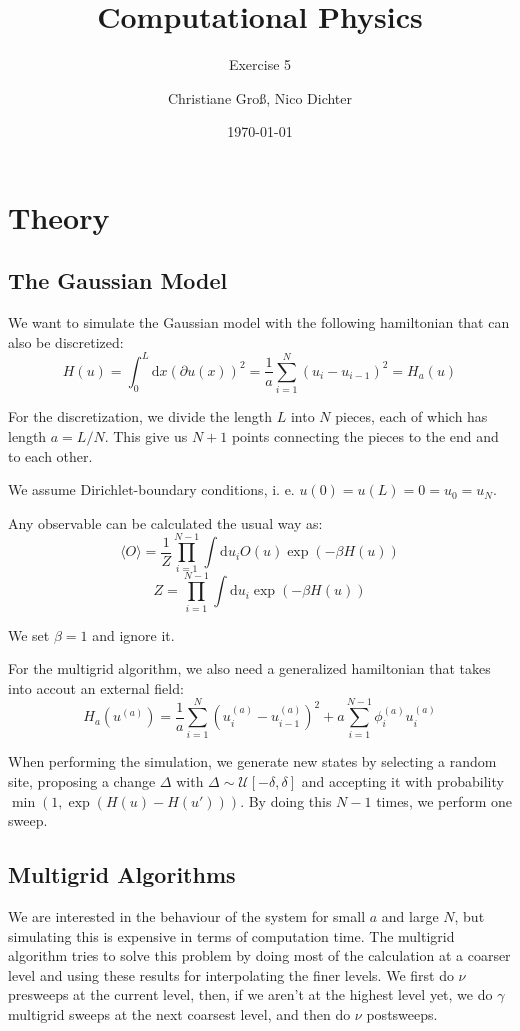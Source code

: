 \documentclass{scrartcl}
\title{Computational Physics}
\subtitle{Exercise 5}
\date{\today}
\author{Christiane Groß, Nico Dichter}
\begin{document}
	\maketitle
	
\section{Theory}
\subsection{The Gaussian Model}

We want to simulate the Gaussian model with the following hamiltonian that can also be discretized:
\[
H(u)=\int_{0}^{L}\mathrm{d}x\left(\partial{u(x)} \right)^2=\frac{1}{a}\sum_{i=1}^{N}\left(u_i-u_{i-1} \right)^2=H_a(u)
\]

For the discretization, we divide the length $L$ into $N$ pieces, each of which has length $a=L/N$. This give us $N+1$ points connecting the pieces to the end and to each other. 

We assume Dirichlet-boundary conditions, i.\! e.\! $u(0)=u(L)=0=u_0=u_N$.

Any observable can be calculated the usual way as: \[
\langle O\rangle=\frac{1}{Z}\prod_{i=1}^{N-1}\int\mathrm{d}u_i O(u)\exp(-\beta H(u)) \]
\[
Z=\prod_{i=1}^{N-1}\int\mathrm{d}u_i\exp(-\beta H(u)) 
\]

We set $\beta=1$ and ignore it.

For the multigrid algorithm, we also need a generalized hamiltonian that takes into accout an external field:
\[
H_a(u^{(a)})=\frac{1}{a}\sum_{i=1}^N
\left( u_i^{(a)}-u_{i-1}^{(a)}\right) ^2+a\sum_{i=1}^{N-1}\phi_i^{(a)}u_i^{(a)}
\]

When performing the simulation, we generate new states by selecting a random site, proposing a change $\Delta$ with $\Delta\sim\mathcal{U}[-\delta, \delta]$ and accepting it with probability $\min(1, \exp(H(u)-H(u')))$. By doing this $N-1$ times, we perform one sweep.

\subsection{Multigrid Algorithms}

We are interested in the behaviour of the system for small $a$ and large $N$, but simulating this is expensive in terms of computation time. The multigrid algorithm tries to solve this problem by doing most of the calculation at a coarser level and using these results for interpolating the finer levels.
We first do $\nu$ presweeps at the current level, then, if we aren't at the highest level yet, we do $\gamma$ multigrid sweeps at the next coarsest level, and then do $\nu$ postsweeps.
\end{document}
